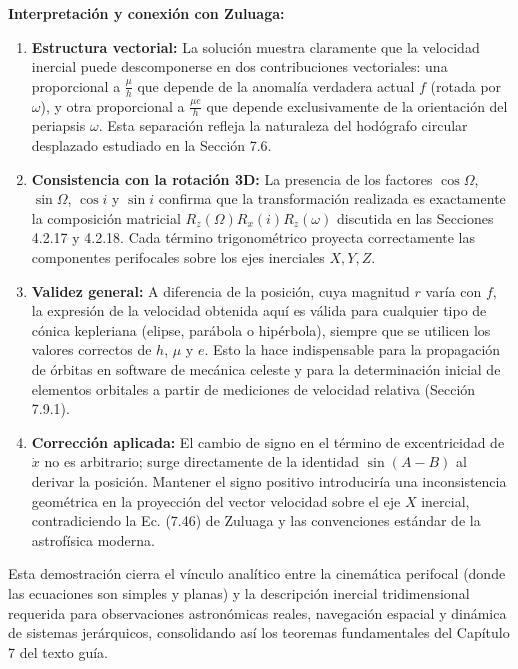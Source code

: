\documentclass[12pt, a4paper]{article}
\begin{document}
\textbf{Interpretación y conexión con Zuluaga:}
\begin{enumerate}
    \item \textbf{Estructura vectorial:} La solución muestra claramente que la velocidad inercial puede descomponerse en dos contribuciones vectoriales: una proporcional a $\frac{\mu}{h}$ que depende de la anomalía verdadera actual $f$ (rotada por $\omega$), y otra proporcional a $\frac{\mu e}{h}$ que depende exclusivamente de la orientación del periapsis $\omega$. Esta separación refleja la naturaleza del hodógrafo circular desplazado estudiado en la Sección 7.6.
    \item \textbf{Consistencia con la rotación 3D:} La presencia de los factores $\cos\Omega$, $\sin\Omega$, $\cos i$ y $\sin i$ confirma que la transformación realizada es exactamente la composición matricial $R_z(\Omega)R_x(i)R_z(\omega)$ discutida en las Secciones 4.2.17 y 4.2.18. Cada término trigonométrico proyecta correctamente las componentes perifocales sobre los ejes inerciales $X, Y, Z$.
    \item \textbf{Validez general:} A diferencia de la posición, cuya magnitud $r$ varía con $f$, la expresión de la velocidad obtenida aquí es válida para cualquier tipo de cónica kepleriana (elipse, parábola o hipérbola), siempre que se utilicen los valores correctos de $h$, $\mu$ y $e$. Esto la hace indispensable para la propagación de órbitas en software de mecánica celeste y para la determinación inicial de elementos orbitales a partir de mediciones de velocidad relativa (Sección 7.9.1).
    \item \textbf{Corrección aplicada:} El cambio de signo en el término de excentricidad de $\dot{x}$ no es arbitrario; surge directamente de la identidad $\sin(A-B)$ al derivar la posición. Mantener el signo positivo introduciría una inconsistencia geométrica en la proyección del vector velocidad sobre el eje $X$ inercial, contradiciendo la Ec. (7.46) de Zuluaga y las convenciones estándar de la astrofísica moderna.
\end{enumerate}

Esta demostración cierra el vínculo analítico entre la cinemática perifocal (donde las ecuaciones son simples y planas) y la descripción inercial tridimensional requerida para observaciones astronómicas reales, navegación espacial y dinámica de sistemas jerárquicos, consolidando así los teoremas fundamentales del Capítulo 7 del texto guía.
\end{document}
